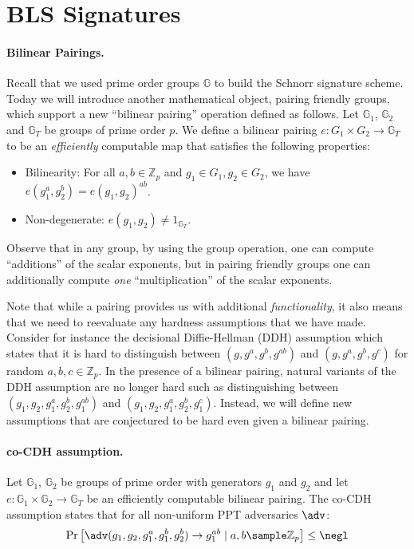 
\section{BLS Signatures}

\paragraph{Bilinear Pairings.} Recall that we used prime order groups $\mathbb{G}$ to build the Schnorr signature scheme. Today we will introduce another mathematical object, pairing friendly groups, which support a new ``bilinear pairing'' operation defined as follows. Let $\mathbb{G}_1$, $\mathbb{G}_2$ and $\mathbb{G}_T$ be groups of prime order $p$. We define a bilinear pairing $e: G_1 \times G_2 \rightarrow \mathbb{G}_T$ to be an \emph{efficiently} computable map that satisfies the following properties:
\begin{itemize}
    \item Bilinearity: For all $a, b \in \mathbb{Z}_p$ and $g_1 \in G_1, g_2 \in G_2$, we have $e(g_1^a, g_2^b) = e(g_1, g_2)^{ab}$.
    \item Non-degenerate: $e(g_1, g_2) \neq 1_{\mathbb{G}_T}$.
\end{itemize}
Observe that in any group, by using the group operation, one can compute ``additions'' of the scalar exponents, but in pairing friendly groups one can additionally compute \emph{one} ``multiplication'' of the scalar exponents.

Note that while a pairing provides us with additional \emph{functionality}, it also means that we need to reevaluate any hardness assumptions that we have made. Consider for instance the decisional Diffie-Hellman (DDH) assumption which states that it is hard to distinguish between $(g, g^a, g^b, g^{ab})$ and $(g, g^a, g^b, g^c)$ for random $a, b, c \in \mathbb{Z}_p$. In the presence of a bilinear pairing, natural variants of the DDH assumption are no longer hard such as distinguishing between $(g_1, g_2, g_1^a, g_2^b, g_1^{ab})$ and $(g_1, g_2, g_1^a, g_2^b, g_1^{c})$. Instead, we will define new assumptions that are conjectured to be hard even given a bilinear pairing.

\paragraph{co-CDH assumption.} Let $\mathbb{G}_1$, $\mathbb{G}_2$ be groups of prime order with generators $g_1$ and $g_2$ and let $e: \mathbb{G}_1 \times \mathbb{G}_2 \rightarrow \mathbb{G}_T$ be an efficiently computable bilinear pairing. The co-CDH assumption states that for all non-uniform PPT adversaries $\adv$:
\begin{align*}
    \Pr\left[ \adv(g_1, g_2, g_1^a, g_1^b, g_2^b) \to g_1^{ab} \mid a,b \sample \mathbb{Z}_p \right] \leq \negl
\end{align*}

